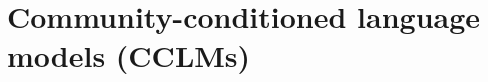 \documentclass[11pt]{article}
\begin{document}




\section{Community-conditioned language models (CCLMs)}\label{sec:cclm}
\end{document}

